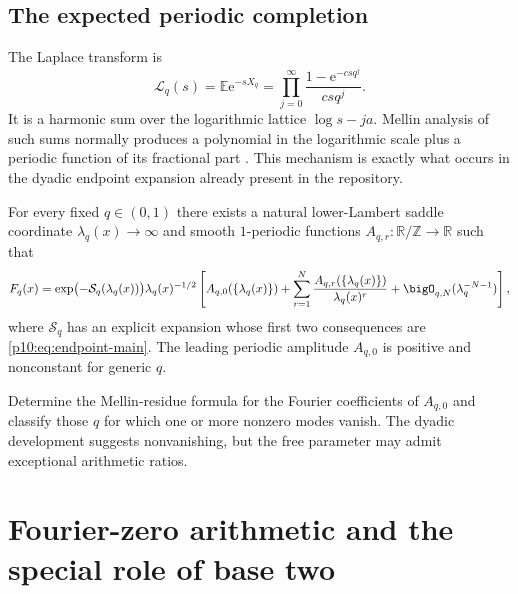 \documentclass[11pt]{article}
\numberwithin{equation}{section}
\theoremstyle{definition}
\theoremstyle{remark}
\newcommand{\R}{\mathbb R}
\newcommand{\Z}{\mathbb Z}
\newcommand{\E}{\mathbb E}
\newcommand{\e}{\mathrm e}
\begin{document}
\subsection{The expected periodic completion}

The Laplace transform is
\begin{equation}
 \mathcal L_q(s)=\E\e^{-sX_q}
 =\prod_{j=0}^{\infty}\frac{1-\e^{-csq^j}}{csq^j}.          \label{p10:eq:laplace-product}
\end{equation}
It is a harmonic sum over the logarithmic lattice $\log s-ja$.  Mellin analysis of such
sums normally produces a polynomial in the logarithmic scale plus a periodic function of its
fractional part \cite{p10:flajolet1995}.  This mechanism is exactly what occurs in the dyadic
endpoint expansion already present in the repository.

\begin{conjecture}
\label{p10:conj:q-transseries}
For every fixed $q\in(0,1)$ there exists a natural lower-Lambert saddle coordinate
$\lambda_q(x)\to\infty$ and smooth $1$-periodic functions
$A_{q,r}:\R/\Z\to\R$ such that
\begin{equation}
 F_q(x)
 =\exp\bigl(-\mathcal S_q(\lambda_q(x))\bigr)
  \lambda_q(x)^{-1/2}
  \left[
   A_{q,0}(\{\lambda_q(x)\})
   +\sum_{r=1}^{N}\frac{A_{q,r}(\{\lambda_q(x)\})}{\lambda_q(x)^r}
   +\bigO_{q,N}(\lambda_q^{-N-1})
  \right],                                                  \label{p10:eq:q-transseries}
\end{equation}
where $\mathcal S_q$ has an explicit expansion whose first two consequences are
\eqref{p10:eq:endpoint-main}.  The leading periodic amplitude $A_{q,0}$ is positive and
nonconstant for generic $q$.
\end{conjecture}

\begin{problem}
Determine the Mellin-residue formula for the Fourier coefficients of $A_{q,0}$ and classify
those $q$ for which one or more nonzero modes vanish.  The dyadic development suggests
nonvanishing, but the free parameter may admit exceptional arithmetic ratios.
\end{problem}

\section{Fourier-zero arithmetic and the special role of base two}
\label{p10:sec:zeros}
\end{document}
